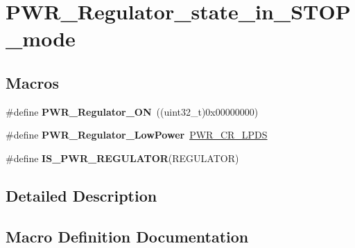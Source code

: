 \hypertarget{group___p_w_r___regulator__state__in___s_t_o_p__mode}{}\section{P\+W\+R\+\_\+\+Regulator\+\_\+state\+\_\+in\+\_\+\+S\+T\+O\+P\+\_\+mode}
\label{group___p_w_r___regulator__state__in___s_t_o_p__mode}
\subsection*{Macros}
\begin{DoxyCompactItemize}
\item 
\hypertarget{group___p_w_r___regulator__state__in___s_t_o_p__mode_gabf58b999bff6b4bf0fb5b97d74a75683}{}\#define {\bfseries P\+W\+R\+\_\+\+Regulator\+\_\+\+O\+N}~((uint32\+\_\+t)0x00000000)\label{group___p_w_r___regulator__state__in___s_t_o_p__mode_gabf58b999bff6b4bf0fb5b97d74a75683}

\item 
\hypertarget{group___p_w_r___regulator__state__in___s_t_o_p__mode_ga13745136d094661358d373b67ebf1ac7}{}\#define {\bfseries P\+W\+R\+\_\+\+Regulator\+\_\+\+Low\+Power}~\hyperlink{group___peripheral___registers___bits___definition_ga3aeb8d6f2539b0a3a4b851aeba0eea66}{P\+W\+R\+\_\+\+C\+R\+\_\+\+L\+P\+D\+S}\label{group___p_w_r___regulator__state__in___s_t_o_p__mode_ga13745136d094661358d373b67ebf1ac7}

\item 
\#define {\bfseries I\+S\+\_\+\+P\+W\+R\+\_\+\+R\+E\+G\+U\+L\+A\+T\+O\+R}(R\+E\+G\+U\+L\+A\+T\+O\+R)
\end{DoxyCompactItemize}


\subsection{Detailed Description}


\subsection{Macro Definition Documentation}
\hypertarget{group___p_w_r___regulator__state__in___s_t_o_p__mode_ga03c105070272141c0bab5f2b74469072}{}
